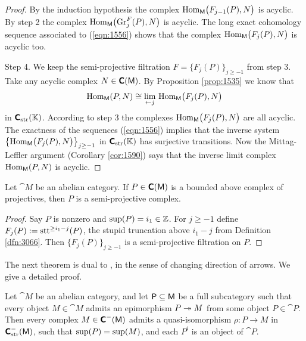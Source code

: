 \begin{proof}
By the induction hypothesis the complex 
$\operatorname{Hom}_{\operatorname{\mathsf{M}}} \bigl( F_{j - 1}(P), N \bigr)$
is acyclic. By step 2 the complex
$\operatorname{Hom}_{\operatorname{\mathsf{M}}} \bigl( \operatorname{Gr}^F_{j}(P), N \bigr)$
is acyclic. The long exact cohomology sequence associated to 
(\ref{eqn:1556}) shows that the complex 
$\operatorname{Hom}_{\operatorname{\mathsf{M}}} \bigl( F_j(P), N \bigr)$
is acyclic too.

\medskip \noindent
Step 4. We keep the semi-projective filtration 
$F = \{ F_j(P) \}_{j \geq -1}$ from step 3. 
Take any acyclic complex $N \in \operatorname{\boldsymbol{\mathsf{C}}}(\operatorname{\mathsf{M}})$. By 
Proposition \ref{prop:1535} we know that 
\[ \operatorname{Hom}_{\operatorname{\mathsf{M}}}(P, N) \cong 
\lim_{\leftarrow j} \, \operatorname{Hom}_{\operatorname{\mathsf{M}}} \bigl( F_j(P), N \bigr) \]
in $\boldsymbol{\mathsf{C}}_{\mathrm{str}}(\mathbb{K})$. According to step 3 the complexes 
$\operatorname{Hom}_{\operatorname{\mathsf{M}}} \bigl( F_j(P), N \bigr)$ are all acyclic. 
The exactness of the sequences (\ref{eqn:1556}) implies that 
the inverse system \lb 
$\bigl\{ \operatorname{Hom}_{\operatorname{\mathsf{M}}} \bigl( F_j(P), N \bigr) \bigr\}_{j \geq -1}$
in $\boldsymbol{\mathsf{C}}_{\mathrm{str}}(\mathbb{K})$ has surjective transitions. Now the 
Mittag-Leffler 
argument (Corollary \ref{cor:1590}) says that the inverse limit complex
$\operatorname{Hom}_{\operatorname{\mathsf{M}}}(P, N)$ is acyclic. 
\end{proof}

\begin{prop} \label{prop:1900}
Let $\cat{M}$ be an abelian category. If $P \in \boldsymbol{\mathsf{C}}(\operatorname{\mathsf{M}})$ is a bounded 
above complex of projectives, then $P$ is a semi-projective complex.
\end{prop}

\begin{proof}
Say $P$ is nonzero and $\operatorname{sup}(P) = i_1 \in \mathbb{Z}$. 
For $j \geq -1$ define 
$F_j(P) := \operatorname{stt}^{\geq i_1 - j}(P)$,
the stupid truncation above $i_1 - j$ from Definition \ref{dfn:3066}.
Then $\{ F_j(P) \}_{j \geq -1}$ is a semi-projective filtration on $P$. 
\end{proof}

The next theorem is dual to \cite[Lemma I.4.6(1)]{RD}, in the sense of 
changing direction of arrows. We give a detailed proof. 

\begin{thm} \label{thm:1540}
Let $\cat{M}$ be an abelian category, and let $\operatorname{\mathsf{P}} \subseteq \operatorname{\mathsf{M}}$ be a
full subcategory such that every object $M \in \cat{M}$ admits an 
epimorphism $P \twoheadrightarrow M$ from some object $P \in \cat{P}$. Then every complex 
$M \in \operatorname{\boldsymbol{\mathsf{C}}}^{-}(\operatorname{\mathsf{M}})$ admits a quasi-isomorphism 
$\rho : P \to  M$ in $\boldsymbol{\mathsf{C}}^-_{\mathrm{str}}(\operatorname{\mathsf{M}})$,
such that $\operatorname{sup}(P) = \operatorname{sup}(M)$, and 
each $P^i$ is an object of $\cat{P}$.
\end{thm}

